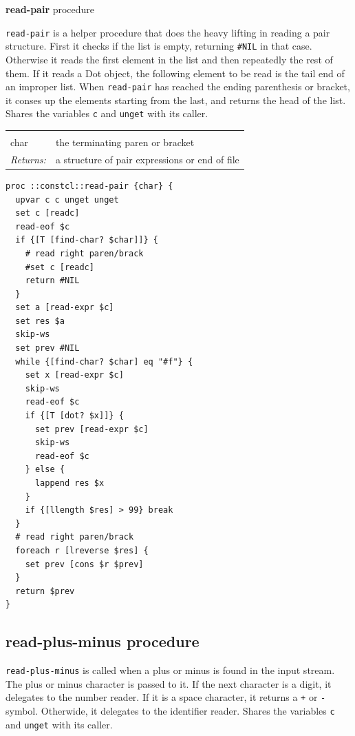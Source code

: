 \documentclass[twoside,9pt]{report}
\begin{document}
\textbf{read-pair} procedure


\texttt{read-pair} is a helper procedure that does the heavy lifting in reading a pair structure. First it checks if the list is empty, returning \texttt{\#NIL} in that case. Otherwise it reads the first element in the list and then repeatedly the rest of them. If it reads a Dot object, the following element to be read is the tail end of an improper list. When \texttt{read-pair} has reached the ending parenthesis or bracket, it conses up the elements starting from the last, and returns the head of the list. Shares the variables \texttt{c} and \texttt{unget} with its caller.

\noindent\begin{tabular}{ |p{1.9cm} p{8cm}| }
\hline
\rowcolor[HTML]{CCCCCC} \multicolumn{2}{|l|}{\bf read-pair (internal)} \\
char & the terminating paren or bracket \\
\textit{Returns:} & a structure of pair expressions or end of file \\
\hline
\end{tabular}
\begin{lstlisting}
proc ::constcl::read-pair {char} {
  upvar c c unget unget
  set c [readc]
  read-eof $c
  if {[T [find-char? $char]]} {
    # read right paren/brack
    #set c [readc]
    return #NIL
  }
  set a [read-expr $c]
  set res $a
  skip-ws
  set prev #NIL
  while {[find-char? $char] eq "#f"} {
    set x [read-expr $c]
    skip-ws
    read-eof $c
    if {[T [dot? $x]]} {
      set prev [read-expr $c]
      skip-ws
      read-eof $c
    } else {
      lappend res $x
    }
    if {[llength $res] > 99} break
  }
  # read right paren/brack
  foreach r [lreverse $res] {
    set prev [cons $r $prev]
  }
  return $prev
}
\end{lstlisting}
\subsection{read-plus-minus procedure}
\label{read-plus-minus-procedure}


\texttt{read-plus-minus} is called when a plus or minus is found in the input stream. The plus or minus character is passed to it. If the next character is a digit, it delegates to the number reader. If it is a space character, it returns a \texttt{+} or \texttt{-} symbol. Otherwide, it delegates to the identifier reader. Shares the variables \texttt{c} and \texttt{unget} with its caller.
\end{document}

